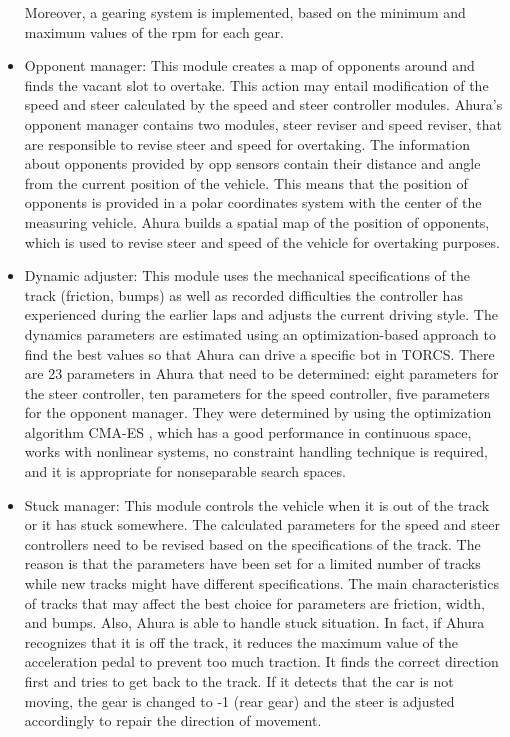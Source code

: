 \begin{itemize}
Moreover, a gearing system is implemented, based on the minimum and maximum values of the rpm for each gear.
\item Opponent manager: This module creates a map of opponents around and finds the vacant slot to overtake. This action may entail modification of the speed and steer calculated by the speed and steer controller modules.
Ahura’s opponent manager contains two modules, steer reviser and speed reviser, that are responsible to revise steer and speed for overtaking. The information about opponents provided by opp sensors contain their distance and angle from the current position of the vehicle. This means that the position of opponents is provided in a polar coordinates system with the center of the measuring vehicle. Ahura builds a spatial map of the position of opponents, which is used to revise steer and speed of the vehicle for overtaking purposes.
\item Dynamic adjuster: This module uses the mechanical specifications of the track (friction, bumps) as well as recorded difficulties the controller has experienced during the earlier laps and adjusts the current driving style.
The dynamics parameters are estimated using an optimization-based approach to find the best values so that Ahura can drive a specific bot in TORCS. There are 23 parameters in Ahura that need to be determined: eight parameters for the steer controller, ten parameters for the speed controller, five parameters for the opponent manager.
They were determined by using the optimization algorithm CMA-ES \cite{cmaes}, which has a good performance in continuous space, works with nonlinear systems, no constraint handling technique is required, and it is appropriate for nonseparable search spaces.
\item Stuck manager: This module controls the vehicle when it is out of the track or it has stuck somewhere.
The calculated parameters for the speed and steer controllers need to be revised based on the specifications of the track. The reason is that the parameters have been set for a limited number of tracks while new tracks might have different specifications. The main characteristics of tracks that may affect the best choice for parameters are friction, width, and bumps. Also, Ahura is able to handle stuck situation. In fact, if Ahura recognizes that it is off the track, it reduces the maximum value of the acceleration pedal to prevent too much traction. It finds the correct direction first and tries to get back to the track. If it detects that the car is not moving, the gear is changed to -1 (rear gear) and the steer is adjusted accordingly to repair the direction of movement.
\end{itemize}


